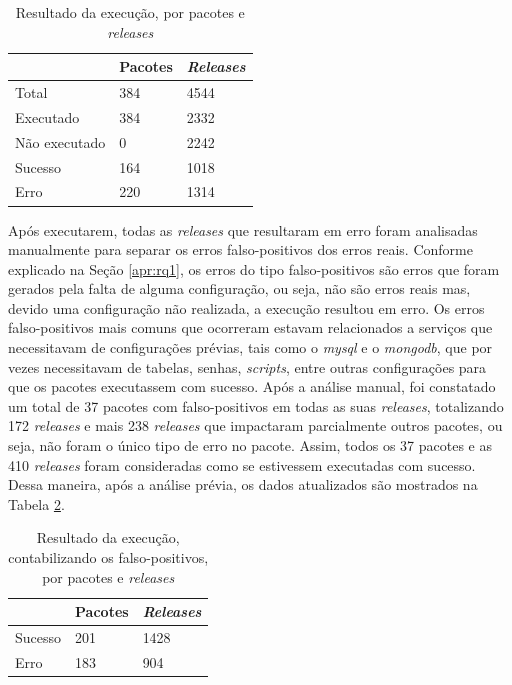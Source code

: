\begin{table}[]
\centering
\begin{tabular}{|l|l|l|}
\hline
                    & Pacotes & \textit{Releases} \\ \hline
    Total           & 384     & 4544     \\
    Executado       & 384     & 2332     \\
    Não executado   & 0       & 2242     \\
    Sucesso         & 164     & 1018     \\
    Erro            & 220     & 1314     \\ \hline
\end{tabular}
\caption{Resultado da execução, por pacotes e \textit{releases}}
\label{tab:res_rq1_1}
\end{table}

Após executarem, todas as \textit{releases} que resultaram em erro foram analisadas manualmente para separar os erros falso-positivos dos erros reais. Conforme explicado na Seção \ref{apr:rq1}, os erros do tipo falso-positivos são erros que foram gerados pela falta de alguma configuração, ou seja, não são erros reais mas, devido uma configuração não realizada, a execução resultou em erro. Os erros falso-positivos mais comuns que ocorreram estavam relacionados a serviços que necessitavam de configurações prévias, tais como o \textit{mysql} e o \textit{mongodb}, que por vezes necessitavam de tabelas, senhas, \textit{scripts}, entre outras configurações para que os pacotes executassem com sucesso. Após a análise manual, foi constatado um total de 37 pacotes com falso-positivos em todas as suas \textit{releases}, totalizando 172 \textit{releases} e mais 238 \textit{releases} que impactaram parcialmente outros pacotes, ou seja, não foram o único tipo de erro no pacote. Assim, todos os 37 pacotes e as 410 \textit{releases} foram consideradas como se estivessem executadas com sucesso. Dessa maneira, após a análise prévia, os dados atualizados são mostrados na Tabela \ref{tab:res_rq1_2}.

\begin{table}[]
\centering
\begin{tabular}{|l|l|l|}
\hline
                    & Pacotes & \textit{Releases} \\ \hline
    Sucesso         & 201     & 1428     \\
    Erro            & 183     & 904     \\ \hline
\end{tabular}
\caption{Resultado da execução, contabilizando os falso-positivos, por pacotes e \textit{releases}}
\label{tab:res_rq1_2}
\end{table}

